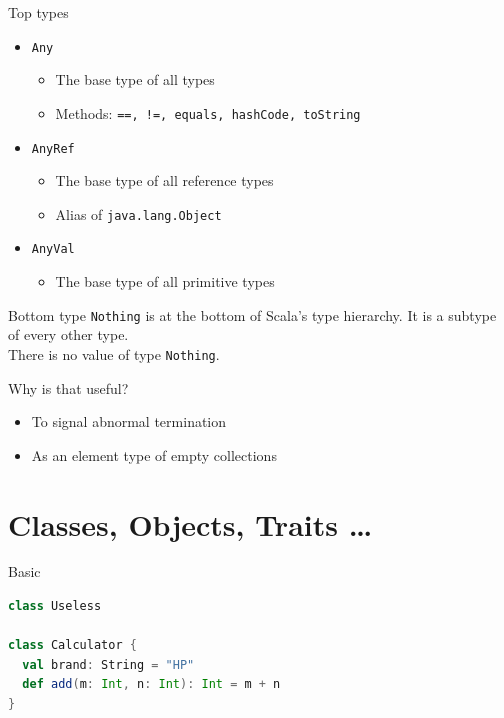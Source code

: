 \documentclass[aspectratio=169]{beamer}
\begin{document}
\begin{frame}{Top types}
\begin{itemize}
  \item \texttt{Any}
    \begin{itemize}
      \item The base type of all types
      \item Methods: \texttt{==, !=, equals, hashCode, toString}
    \end{itemize}
    \pause
  \item \texttt{AnyRef}
    \begin{itemize}
      \item The base type of all reference types
      \item Alias of \texttt{java.lang.Object}
    \end{itemize}
    \pause
  \item \texttt{AnyVal}
    \begin{itemize}
      \item The base type of all primitive types
    \end{itemize}
\end{itemize}
\end{frame}

\begin{frame}{Bottom type}
 \texttt{Nothing} is at the bottom of Scala's type hierarchy. It is a subtype of every other type.\\
 There is no value of type \texttt{Nothing}.
 \vspace{2em}
 \begin{block}{Why is that useful?}
   \begin{itemize}
     \item To signal abnormal termination
     \item As an element type of empty collections
   \end{itemize}
 \end{block}
\end{frame}

\section{Classes, Objects, Traits \ldots}

\begin{frame}[fragile]{Basic}
  \begin{lstlisting}[style=scala,language=scala]
class Useless

class Calculator {
  val brand: String = "HP"
  def add(m: Int, n: Int): Int = m + n
}
  \end{lstlisting}
\end{frame}
\end{document}
